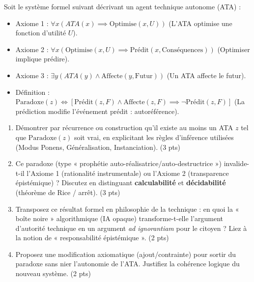 \documentclass[11pt]{article}
\begin{document}
\begin{exercice}
Soit le système formel suivant décrivant un agent technique autonome (ATA) :
\begin{itemize}
    \item Axiome 1 : $\forall x (ATA(x) \implies \text{Optimise}(x, U))$ \quad (L'ATA optimise une fonction d'utilité $U$).
    \item Axiome 2 : $\forall x (\text{Optimise}(x, U) \implies \text{Prédit}(x, \text{Conséquences}))$ \quad (Optimiser implique prédire).
    \item Axiome 3 : $\exists y (ATA(y) \land \text{Affecte}(y, \text{Futur}))$ \quad (Un ATA affecte le futur).
    \item Définition : $\text{Paradoxe}(z) \iff [\text{Prédit}(z, F) \land \text{Affecte}(z, F) \implies \neg \text{Prédit}(z, F)]$ \quad (La prédiction modifie l'événement prédit : autoréférence).
\end{itemize}
\begin{enumerate}
    \item Démontrer par récurrence ou construction qu'il existe au moins un ATA $z$ tel que $\text{Paradoxe}(z)$ soit vrai, en explicitant les règles d'inférence utilisées (Modus Ponens, Généralisation, Instanciation). \hfill (3 pts)
    \item Ce paradoxe (type « prophétie auto-réalisatrice/auto-destructrice ») invalide-t-il l'Axiome 1 (rationalité instrumentale) ou l'Axiome 2 (transparence épistémique) ? Discutez en distinguant \textbf{calculabilité} et \textbf{décidabilité} (théorème de Rice / arrêt). \hfill (3 pts)
    \item Transposez ce résultat formel en philosophie de la technique : en quoi la « boîte noire » algorithmique (IA opaque) transforme-t-elle l'argument d'autorité technique en un argument \textit{ad ignorantiam} pour le citoyen ? Liez à la notion de « responsabilité épistémique ». \hfill (2 pts)
    \item Proposez une modification axiomatique (ajout/contrainte) pour sortir du paradoxe sans nier l'autonomie de l'ATA. Justifiez la cohérence logique du nouveau système. \hfill (2 pts)
\end{enumerate}
\end{exercice}
\end{document}
